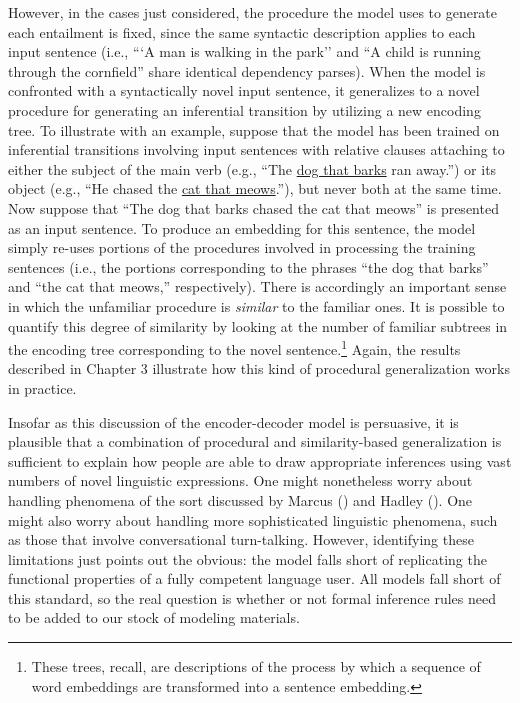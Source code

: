 However, in the cases just considered, the procedure the model uses to generate each entailment is fixed, since the same syntactic description applies to each input sentence (i.e., ```A man is walking in the park'' and ``A child is running through the cornfield'' share identical dependency parses). When the model is confronted with a syntactically novel input sentence, it generalizes to a novel procedure for generating an inferential transition by utilizing a new encoding tree. To illustrate with an example, suppose that the model has been trained on inferential transitions involving input sentences with relative clauses attaching to either the subject of the main verb (e.g., ``The \underline{dog that barks} ran away.'') or its object (e.g., ``He chased the \underline{cat that meows}.''), but never both at the same time. Now suppose that ``The dog that barks chased the cat that meows'' is presented as an input sentence. To produce an embedding for this sentence, the model simply re-uses portions of the procedures involved in processing the training sentences (i.e., the portions corresponding to the phrases ``the dog that barks'' and ``the cat that meows,'' respectively). There is accordingly an important sense in which the unfamiliar procedure is \textit{similar} to the familiar ones. It is possible to quantify this degree of similarity by looking at the number of familiar subtrees in the encoding tree corresponding to the novel sentence.\footnote{These trees, recall, are descriptions of the process by which a sequence of word embeddings are transformed into a sentence embedding.} Again, the results described in Chapter 3 illustrate how this kind of procedural generalization works in practice. 
 
Insofar as this discussion of the encoder-decoder model is persuasive, it is plausible that a combination of procedural and similarity-based generalization is sufficient to explain how people are able to draw appropriate inferences using vast numbers of novel linguistic expressions. One might nonetheless worry about handling phenomena of the sort discussed by Marcus (\citeyear{Marcus:1998}) and Hadley (\citeyear{Hadley:2009}). One might also worry about handling more sophisticated linguistic phenomena, such as those that involve conversational turn-talking. However, identifying these limitations just points out the obvious: the model falls short of replicating the functional properties of a fully competent language user. All models fall short of this standard, so the real question is whether or not formal inference rules need to be added to our stock of modeling materials.


